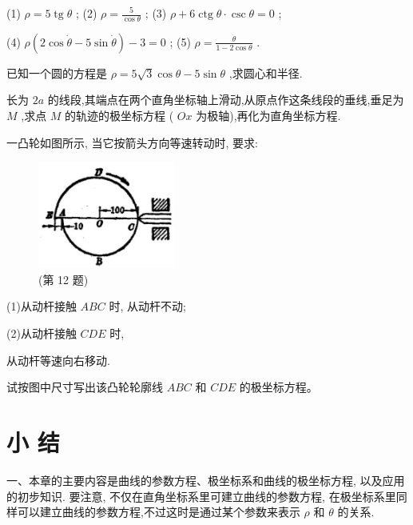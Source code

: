 \documentclass[lang=cn,newtx,10pt,scheme=chinese]{elegantbook}
\begin{document}
\begin{problemset}[习 题 十 四]
(1) \(\rho = 5\operatorname{tg}\theta\) ; (2) \(\rho = \frac{5}{\cos \theta }\) ; (3) \(\rho + 6\operatorname{ctg}\theta \cdot \csc \theta = 0\) ;

(4) \(\rho \left( {2\cos \dot{\theta } - 5\sin \dot{\theta }}\right) - 3 = 0\) ; (5) \(\rho = \frac{\dot{\theta }}{1 - 2\cos \theta }\) .

\item 已知一个圆的方程是 \(\rho = 5\sqrt{3}\cos \theta - 5\sin \theta\) ,求圆心和半径.

\item 长为 \({2a}\) 的线段,其端点在两个直角坐标轴上滑动,从原点作这条线段的垂线,垂足为 \(M\) ,求点 \(M\) 的轨迹的极坐标方程 ( \({Ox}\) 为极轴),再化为直角坐标方程.

\item 一凸轮如图所示, 当它按箭头方向等速转动时, 要求:

\begin{figure}[h]
  \centering
  \includegraphics[max width=0.4\textwidth]{images/01912cc2-ffb6-728e-9ae7-b113ff05c64b_189_903948.jpg}
  \caption{(第 12 题)}
\end{figure}



(1)从动杆接触 \({ABC}\) 时, 从动杆不动;

(2)从动杆接触 \({CDE}\) 时,

从动杆等速向右移动.

试按图中尺寸写出该凸轮轮廓线 \({ABC}\) 和 \({CDE}\) 的极坐标方程。

\end{problemset}

\chapter*{小 结}

一、本章的主要内容是曲线的参数方程、极坐标系和曲线的极坐标方程, 以及应用的初步知识. 要注意, 不仅在直角坐标系里可建立曲线的参数方程, 在极坐标系里同样可以建立曲线的参数方程,不过这时是通过某个参数来表示 \(\rho\) 和 \(\theta\) 的关系.
\end{document}
